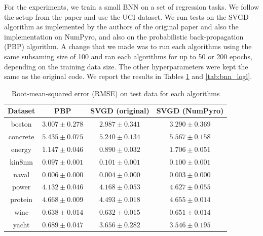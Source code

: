 For the experiments, we train a small BNN on a set of regression tasks. We follow the setup from the paper and use the UCI dataset. We run tests on the SVGD algorithm as implemented by the authors of the original paper and also the implementation on NumPyro, and also on the probabilistic back-propagation (PBP) algorithm. A change that we made was to run each algorithms using the same subsaming size of 100 and ran each algorithms for up to 50 or 200 epochs, depending on the training data size. The other hyperparameters were kept the same as the original code. We report the results in Tables \ref{tab:bnn_rmse} and \ref{tab:bnn_logl}. 

\begin{table}[]
\centering
\caption{Root-mean-squared error (RMSE) on test data for each algorithms} 
\label{tab:bnn_rmse}
\begin{tabular}{|c|ccc|}
\hline
 Dataset & PBP & SVGD (original) & SVGD (NumPyro)  \\
 \hline
boston & $3.007 \pm 0.278$ & $2.987 \pm 0.341$ & $3.290 \pm 0.369$ \\
concrete & $5.435 \pm 0.075$ & $5.240 \pm 0.134$ & $5.567 \pm 0.158$ \\
energy & $1.147 \pm 0.046$ & $0.890 \pm 0.032$ & $1.706 \pm 0.051$ \\
kin8nm & $0.097 \pm 0.001$ & $0.101 \pm 0.001$ & $0.100 \pm 0.001$ \\
naval & $0.006 \pm 0.000$ & $0.004 \pm 0.000$ & $0.003 \pm 0.000$ \\
power & $4.132 \pm 0.046$ & $4.168 \pm 0.053$ & $4.627 \pm 0.055$ \\
protein & $4.668 \pm 0.009$ & $4.493 \pm 0.018$ & $4.655 \pm 0.014$ \\
wine & $0.638 \pm 0.014$ & $0.632 \pm 0.015$ & $0.651 \pm 0.014$ \\
yacht & $0.689 \pm 0.047$ & $3.656 \pm 0.282$ & $3.546 \pm 0.195$ \\
\hline
\end{tabular}
\end{table}

